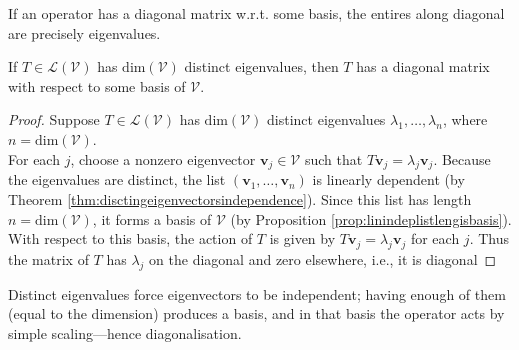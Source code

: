 If an operator has a diagonal matrix w.r.t. some basis, the entires along diagonal are precisely eigenvalues.

\begin{proposition} If $T \in \mathcal{L}(\mathcal{V})$ has $\text{dim}(\mathcal{V})$ distinct eigenvalues, then $T$ has a diagonal matrix with respect to some basis of $\mathcal{V}$.
\begin{proof} Suppose $T \in \mathcal{L}(\mathcal{V})$ has $\text{dim}(\mathcal{V})$ distinct eigenvalues $\lambda_1, \ldots, \lambda_n$, where $n = \text{dim}(\mathcal{V})$.\\
For each $j$, choose a nonzero eigenvector $\mathbf{v}_j \in \mathcal{V}$ such that $T \mathbf{v}_j = \lambda_j \mathbf{v}_j$. Because the eigenvalues are distinct, the list $(\mathbf{v}_1, \ldots, \mathbf{v}_n)$ is linearly dependent (by Theorem \ref{thm:disctingeigenvectorsindependence}). Since this list has length $n = \text{dim}(\mathcal{V})$, it forms a basis of $\mathcal{V}$ (by Proposition \ref{prop:linindeplistlengisbasis}).\\
With respect to this basis, the action of $T$ is given by $T \mathbf{v}_j = \lambda_j \mathbf{v}_j$ for each $j$. Thus the matrix of $T$ has $\lambda_j$ on the diagonal and zero elsewhere, i.e., it is diagonal
\end{proof}
\end{proposition}

Distinct eigenvalues force eigenvectors to be independent; having enough of them (equal to the dimension) produces a basis, and in that basis the operator acts by simple scaling—hence diagonalisation.


